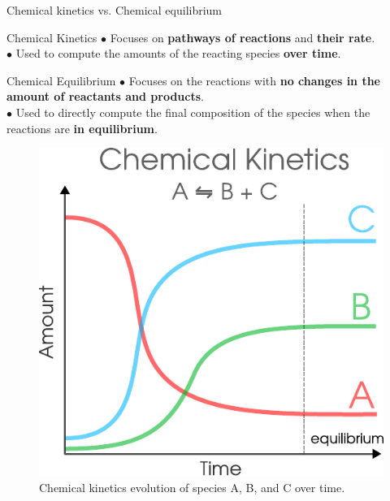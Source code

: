 \begin{frame}{Chemical kinetics vs. Chemical equilibrium}
%
\small
\lcol
\vskip 10pt
\begin{cbox}{Chemical Kinetics}
$\bullet$ Focuses on \alert{\textbf{pathways of reactions}} and  \alert{\textbf{their rate}}. \\
$\bullet$ Used to compute the amounts of the reacting species \alert{\textbf{over time}}. \\
\end{cbox}

\begin{cbox}{Chemical Equilibrium} 
$\bullet$ Focuses on the reactions with \alert{\textbf{no changes in the amount of reactants and products}}. \\
$\bullet$ Used to directly compute the final composition of the species when
the reactions are \alert{\textbf{in equilibrium}}. 
\end{cbox}

\rcol

\vskip 10pt
\begin{figure}
\centering
\includegraphics[width=0.8\columnwidth]{figures/applications/chemical-kinetics-equilibrium-illustration-evolution-plot}
\caption*{Chemical kinetics evolution of species A, B, and C over time.}
\end{figure}

\ecol

\end{frame}


